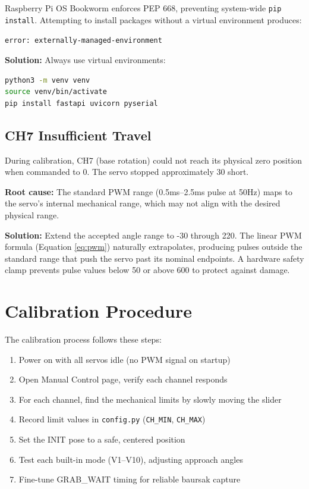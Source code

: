 \documentclass[12pt,a4paper]{article}
\begin{document}
Raspberry Pi OS Bookworm enforces PEP 668, preventing system-wide \texttt{pip install}. Attempting to install packages without a virtual environment produces:

\texttt{error: externally-managed-environment}

\textbf{Solution:} Always use virtual environments:
\begin{lstlisting}[language=bash, caption=Python setup on Bookworm]
python3 -m venv venv
source venv/bin/activate
pip install fastapi uvicorn pyserial
\end{lstlisting}

\subsection{CH7 Insufficient Travel}

During calibration, CH7 (base rotation) could not reach its physical zero position when commanded to 0\textdegree. The servo stopped approximately 30\textdegree{} short.

\textbf{Root cause:} The standard PWM range (0.5ms--2.5ms pulse at 50Hz) maps to the servo's internal mechanical range, which may not align with the desired physical range.

\textbf{Solution:} Extend the accepted angle range to -30\textdegree{} through 220\textdegree. The linear PWM formula (Equation \ref{eq:pwm}) naturally extrapolates, producing pulses outside the standard range that push the servo past its nominal endpoints. A hardware safety clamp prevents pulse values below 50 or above 600 to protect against damage.

\section{Calibration Procedure}

The calibration process follows these steps:

\begin{enumerate}[leftmargin=2cm]
    \item Power on with all servos idle (no PWM signal on startup)
    \item Open Manual Control page, verify each channel responds
    \item For each channel, find the mechanical limits by slowly moving the slider
    \item Record limit values in \texttt{config.py} (\texttt{CH\_MIN}, \texttt{CH\_MAX})
    \item Set the INIT pose to a safe, centered position
    \item Test each built-in mode (V1--V10), adjusting approach angles
    \item Fine-tune GRAB\_WAIT timing for reliable baursak capture
\end{enumerate}
\end{document}
